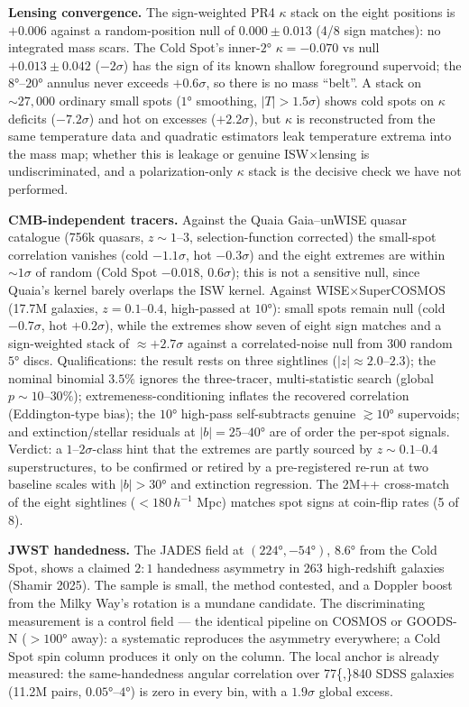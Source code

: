 \documentclass[
]{article}
\begin{document}
\textbf{Lensing convergence.} The sign-weighted PR4 \(\kappa\) stack on
the eight positions is \(+0.006\) against a random-position null of
\(0.000 \pm 0.013\) (4/8 sign matches): no integrated mass scars. The
Cold Spot's inner-\(2°\) \(\kappa = -0.070\) vs null
\(+0.013 \pm 0.042\) (\(-2\sigma\)) has the sign of its known shallow
foreground supervoid; the \(8°\)--\(20°\) annulus never exceeds
\(+0.6\sigma\), so there is no mass ``belt''. A stack on
\(\sim\!27{,}000\) ordinary small spots (\(1°\) smoothing,
\(|T| > 1.5\sigma\)) shows cold spots on \(\kappa\) deficits
(\(-7.2\sigma\)) and hot on excesses (\(+2.2\sigma\)), but \(\kappa\) is
reconstructed from the same temperature data and quadratic estimators
leak temperature extrema into the mass map; whether this is leakage or
genuine ISW\(\times\)lensing is undiscriminated, and a polarization-only
\(\kappa\) stack is the decisive check we have not performed.

\textbf{CMB-independent tracers.} Against the Quaia Gaia--unWISE quasar
catalogue (756k quasars, \(z \sim 1\)--\(3\), selection-function
corrected) the small-spot correlation vanishes (cold \(-1.1\sigma\), hot
\(-0.3\sigma\)) and the eight extremes are within \(\sim\!1\sigma\) of
random (Cold Spot \(-0.018\), \(0.6\sigma\)); this is not a sensitive
null, since Quaia's kernel barely overlaps the ISW kernel. Against
WISE\(\times\)SuperCOSMOS (17.7M galaxies, \(z = 0.1\)--\(0.4\),
high-passed at \(10°\)): small spots remain null (cold \(-0.7\sigma\),
hot \(+0.2\sigma\)), while the extremes show seven of eight sign matches
and a sign-weighted stack of \(\approx +2.7\sigma\) against a
correlated-noise null from 300 random \(5°\) discs. Qualifications: the
result rests on three sightlines (\(|z| \approx 2.0\)--\(2.3\)); the
nominal binomial \(3.5\%\) ignores the three-tracer, multi-statistic
search (global \(p \sim 10\)--\(30\%\)); extremeness-conditioning
inflates the recovered correlation (Eddington-type bias); the \(10°\)
high-pass self-subtracts genuine \(\gtrsim 10°\) supervoids; and
extinction/stellar residuals at \(|b| = 25\)--\(40°\) are of order the
per-spot signals. Verdict: a \(1\)--\(2\sigma\)-class hint that the
extremes are partly sourced by \(z \sim 0.1\)--\(0.4\) superstructures,
to be confirmed or retired by a pre-registered re-run at two baseline
scales with \(|b| > 30°\) and extinction regression. The 2M++
cross-match of the eight sightlines (\(< 180\,h^{-1}\) Mpc) matches spot
signs at coin-flip rates (5 of 8).

\textbf{JWST handedness.} The JADES field at \((224°, -54°)\), \(8.6°\)
from the Cold Spot, shows a claimed \(2\!:\!1\) handedness asymmetry in
263 high-redshift galaxies (Shamir 2025). The sample is small, the
method contested, and a Doppler boost from the Milky Way's rotation is a
mundane candidate. The discriminating measurement is a control field ---
the identical pipeline on COSMOS or GOODS-N (\(> 100°\) away): a
systematic reproduces the asymmetry everywhere; a Cold Spot spin column
produces it only on the column. The local anchor is already measured:
the same-handedness angular correlation over 77\{,\}840 SDSS galaxies
(11.2M pairs, \(0.05°\)--\(4°\)) is zero in every bin, with a
\(1.9\sigma\) global excess.
\end{document}
